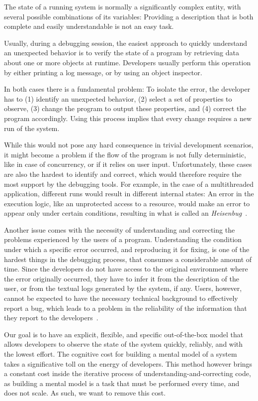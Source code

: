 The state of a running system is normally a significantly complex entity, with several possible combinations of its variables: Providing a description that is both complete and easily understandable is not an easy task.

Usually, during a debugging session, the easiest approach to quickly understand an unexpected behavior is to verify the state of a program by retrieving data about one or more objects at runtime.
Developers usually perform this operation by either printing a log message, or by using an object inspector.

In both cases there is a fundamental problem: To isolate the error, the developer has to (1) identify an unexpected behavior, (2) select a set of properties to observe, (3) change the program to output these properties, and (4) correct the program accordingly.
Using this process implies that every change requires a new run of the system.

While this would not pose any hard consequence in trivial development scenarios, it might become a problem if the flow of the program is not fully deterministic, like in case of concurrency, or if it relies on user input.
Unfortunately, these cases are also the hardest to identify and correct, which would therefore require the most support by the debugging tools.
For example, in the case of a multithreaded application, different runs would result in different internal states: An error in the execution logic, like an unprotected access to a resource, would make an error to appear only under certain conditions, resulting in what is called an \emph{Heisenbug}~\cite{Grot2005}.

Another issue comes with the necessity of understanding and correcting the problems experienced by the users of a program.
Understanding the condition under which a specific error occurred, and reproducing it for fixing, is one of the hardest things in the debugging process, that consumes a considerable amount of time.
Since the developers do not have access to the original environment where the error originally occurred, they have to infer it from the description of the user, or from the textual logs generated by the system, if any.
Users, however, cannot be expected to have the necessary technical background to effectively report a bug, which leads to a problem in the reliability of the information that they report to the developers~\cite{Zimm2010a}.

Our goal is to have an explicit, flexible, and specific out-of-the-box model that allows developers to observe the state of the system quickly, reliably, and with the lowest effort.
The cognitive cost for building a mental model of a system takes a significative toll on the energy of developers.
This method however brings a constant cost inside the iterative process of understanding-and-correcting code, as building a mental model is a task that must be performed every time, and does not scale.
As such, we want to remove this cost.

